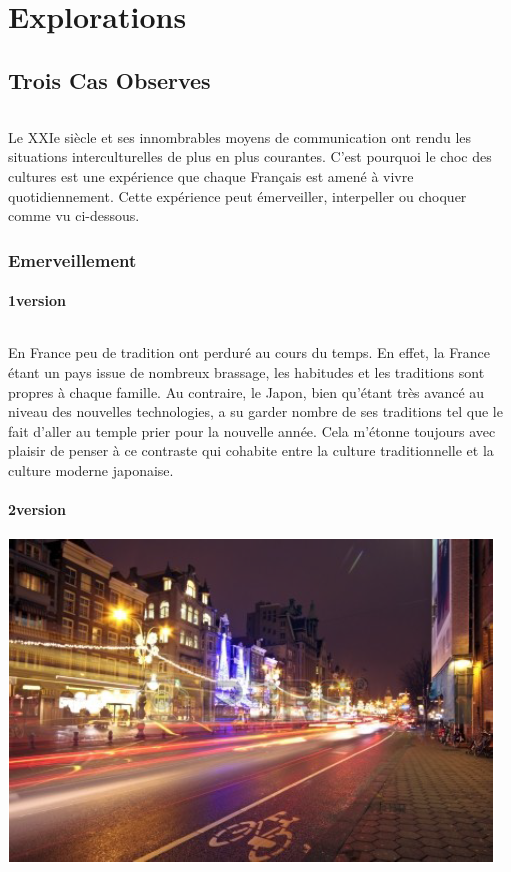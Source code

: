 \part{Explorations}
\chapter{Trois Cas Observes}

\paragraph{} Le XXIe siècle et ses innombrables moyens de communication ont
rendu les situations interculturelles de plus en plus courantes. C'est pourquoi
le choc des cultures est une expérience que chaque Français est amené à vivre
quotidiennement. Cette expérience peut émerveiller, interpeller ou choquer
comme vu ci-dessous.

\section{Emerveillement}

\subsection{1\iere version}

\paragraph{} En France peu de tradition ont perduré au cours du temps. En
effet, la France étant un pays issue de nombreux brassage, les habitudes et les
traditions sont propres à chaque famille. Au contraire, le Japon, bien qu'étant
très avancé au niveau des nouvelles technologies, a su garder nombre de ses
traditions tel que le fait d'aller au temple prier pour la nouvelle année. Cela
m'étonne toujours avec plaisir de penser à ce contraste qui cohabite entre la
culture traditionnelle et la culture moderne japonaise.

\subsection{2\ieme version}

\begin{center}
	\includegraphics[scale=0.7]{Amsterdam1.jpg}
\end{center}

